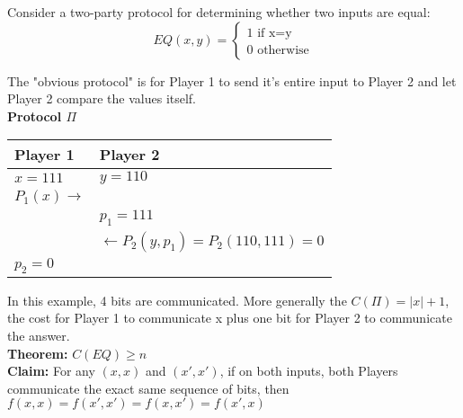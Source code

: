 \documentclass[12pt]{article}
\begin{document}
\maketitle

Consider a two-party protocol for determining whether two inputs are equal:
\begin{equation}
  EQ(x, y) =
  \begin{cases}
    1 \text{ if x=y} \\
    0 \text{ otherwise}
  \end{cases}
\end{equation}


The "obvious protocol" is for Player 1 to send it's entire input to Player 2 and let Player 2 compare the values itself.
\\

\textbf{Protocol $\Pi$}
\begin{center}
  \begin{tabular}{ |m{15em}|m{15em}| } 
    \hline
    Player 1                   & Player 2 \\ [0.5ex] 
    \hline
    $x=111$                    & $y=110$ \\
    $P_{1}(x) \longrightarrow$ &  \\
                               & $p_{1} = 111$ \\
                               & $\longleftarrow P_{2}(y, p_{1}) = P_{2}(110, 111) = 0$ \\
    $p_{2} = 0$                & \\
    \hline
  \end{tabular}
\end{center}

In this example, 4 bits are communicated. More generally the $C(\Pi) = |x| + 1$, the cost for Player 1 to communicate x
plus one bit for Player 2 to communicate the answer.
\\

\textbf{Theorem:} $C(EQ) \geq n$
\\

\textbf{Claim:} For any $(x, x)$ and $(x', x')$, if on both inputs, both Players communicate the exact same sequence of
bits, then $f(x, x) = f(x', x') = f(x, x') = f(x', x)$
\end{document}
